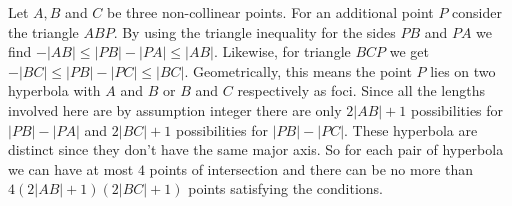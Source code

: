 \documentclass[12pt]{article}
\begin{document}
Let $A,B$ and $C$ be three non-collinear points. For an additional point $P$ consider the triangle $ABP$. By using the triangle inequality for the sides $PB$ and $PA$ we find $-|AB|\leq |PB|-|PA|\leq |AB|$. Likewise, for triangle $BCP$ we get $-|BC|\leq |PB|-|PC|\leq |BC|$. Geometrically, this means the point $P$ lies on two hyperbola with $A$ and $B$ or $B$ and $C$ respectively as foci. Since all the lengths involved here are by assumption integer there are only $2|AB|+1$ possibilities for $|PB|-|PA|$ and $2|BC|+1$ possibilities for $|PB|-|PC|$. These hyperbola are distinct since they don't have the same major axis. So for each pair of hyperbola we can have at most $4$ points of intersection and there can be no more than $4(2|AB|+1)(2|BC|+1)$ points satisfying the conditions.
\end{document}
